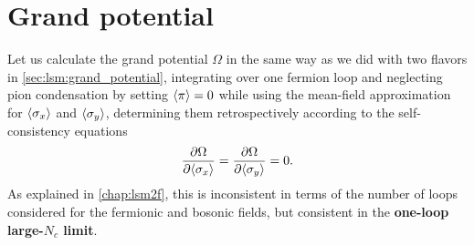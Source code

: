 \section{Grand potential}

Let us calculate the grand potential $\Omega$ in the same way as we did with two flavors in \cref{sec:lsm:grand_potential},
integrating over one fermion loop and
neglecting pion condensation by setting $\langle \pi \rangle=0$
while using the mean-field approximation for $\langle \sigma_x \rangle$ and $\langle \sigma_y \rangle$,
determining them retrospectively according to the self-consistency equations
\begin{equation}
	\pdv{\Omega}{ \langle \sigma_x \rangle} =
	\pdv{\Omega}{ \langle \sigma_y \rangle} = 0.
\end{equation}
As explained in \cref{chap:lsm2f},
this is inconsistent in terms of the number of loops considered for the fermionic and bosonic fields,
but consistent in the \textbf{one-loop large-$N_c$ limit}.

